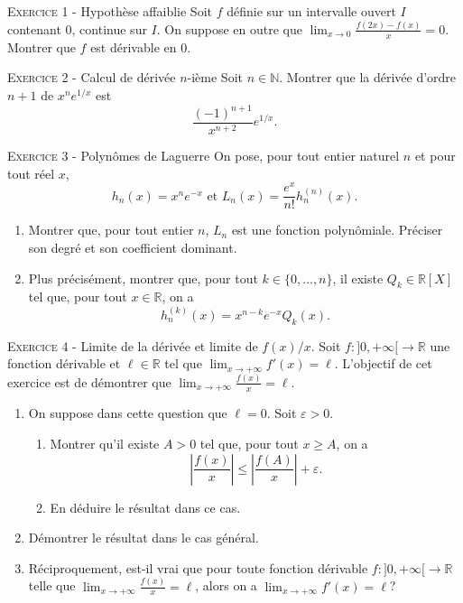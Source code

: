 \documentclass[11pt]{article}
\newcommand{\veps}{\varepsilon}
\begin{document}
 

\begin{center}\textsc{{\huge }}\end{center}



\vskip0.3cm\noindent\textsc{Exercice 1} - Hypothèse affaiblie
\vskip0.2cm
Soit $f$ définie sur un intervalle ouvert $I$ contenant $0$, continue sur $I$.
On suppose en outre que $\lim_{x\to 0}\frac{f(2x)-f(x)}{x}=0$. Montrer que $f$ est dérivable en 0.





\vskip0.3cm\noindent\textsc{Exercice 2} - Calcul de dérivée $n$-ième
\vskip0.2cm
Soit $n\in\mathbb N$. Montrer que la dérivée d'ordre $n+1$ de $x^ne^{1/x}$ est
$$\frac{(-1)^{n+1}}{x^{n+2}}e^{1/x}.$$




\vskip0.3cm\noindent\textsc{Exercice 3} - Polynômes de Laguerre
\vskip0.2cm
On pose, pour tout entier naturel $n$ et pour tout réel $x$, 
$$h_n(x)=x^ne^{-x}\textrm{ et }L_n(x)=\frac{e^x}{n!}h_n^{(n)}(x).$$
\begin{enumerate}
\item Montrer que, pour tout entier $n$, $L_n$ est une fonction polynômiale. Préciser son degré et son coefficient dominant.
\item Plus précisément, montrer que, pour tout $k\in\{0,\dots,n\}$, il existe $Q_k\in\mathbb R[X]$ tel que, pour tout $x\in\mathbb R$, on a
$$h_n^{(k)}(x)=x^{n-k}e^{-x}Q_k(x).$$
\end{enumerate}




\vskip0.3cm\noindent\textsc{Exercice 4} - Limite de la dérivée et limite de $f(x)/x$.
\vskip0.2cm
Soit $f:]0,+\infty[\to\mathbb R$ une fonction dérivable et $\ell\in\mathbb R$ tel que $\lim_{x\to+\infty}f'(x)=\ell$. L'objectif de cet exercice est de démontrer que $\lim_{x\to+\infty}\frac{f(x)}x=\ell$. 
\begin{enumerate}
\item On suppose dans cette question que $\ell=0$. Soit $\veps>0$.
\begin{enumerate}
\item Montrer qu'il existe $A>0$ tel que, pour tout $x\geq A$, on a 
$$\left|\frac{f(x)}{x}\right|\leq \left|\frac{f(A)}{x}\right|+\veps.$$
\item En déduire le résultat dans ce cas.
\end{enumerate}
\item Démontrer le résultat dans le cas général.
\item Réciproquement, est-il vrai que pour toute fonction dérivable $f:]0,+\infty[\to \mathbb R$ telle que $\lim_{x\to+\infty}\frac{f(x)}x=\ell$, alors on a $\lim_{x\to+\infty}f'(x)=\ell$?
\end{enumerate}
\end{document}
